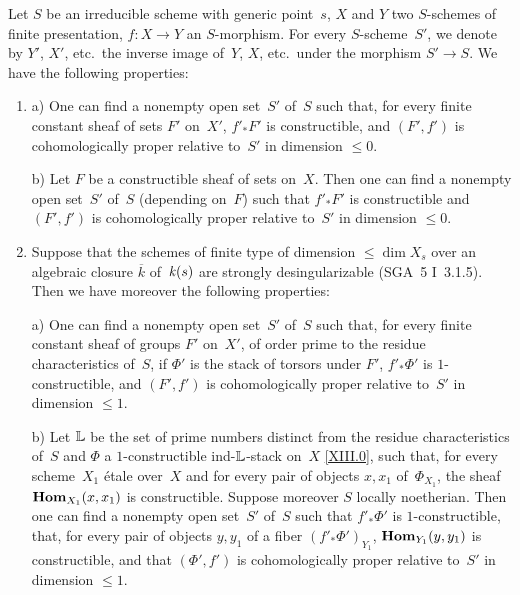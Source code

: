 \begin{theorem}
\label{XIII.3.1}
Let $S$ be an irreducible scheme with generic
point~$s$, $X$ and $Y$ two $S$-schemes of
finite presentation, $f\colon X \to Y$ an $S$-morphism. For every
$S$-scheme~$S'$, we denote by $Y'$, $X'$, etc.\ the inverse image of~$Y$,
$X$, etc.\ under the morphism $S' \to S$. We have the following
properties:

\begin{enumerate}
\item[1)]
{\upshape a)} One can find a nonempty open set~$S'$ of~$S$ such that, for
every finite constant sheaf of sets $F'$ on~$X'$, $f'_*F'$ is
constructible, and $(F',f')$ is cohomologically proper
relative to~$S'$ in dimension $\le 0$.

{\upshape b)} Let $F$ be a constructible sheaf of sets on~$X$. Then
one can find a nonempty open set~$S'$ of~$S$ (depending on~$F$)
such that $f'_*F'$ is constructible and $(F',f')$ is
cohomologically proper relative to~$S'$ in dimension $\le 0$.

\item[2)] Suppose that the schemes of finite type of dimension $\le
\dim X_s$ over an algebraic closure $\overline{k}$ of~$\mathit{k}(s)$
are strongly desingularizable \textup{(SGA~5 I~3.1.5)}. Then we have
moreover the following properties:

{\upshape a)} One can find a nonempty open set~$S'$ of~$S$ such that, for
every finite constant sheaf of groups $F'$ on~$X'$, of order prime
to the residue characteristics of~$S$, if $\Phi'$ is the
stack of torsors under $F'$, $f'_*\Phi'$ is $1$-constructible, and
$(F',f')$ is cohomologically proper relative to~$S'$ in
dimension $\le 1$.

{\upshape b)} Let $\mathbb{L}$ be the set of prime numbers distinct from the
residue characteristics of~$S$ and $\Phi$ a
$1$-constructible ind-$\mathbb{L}$-stack on~$X$ \eqref{XIII.0}, such that,
for every scheme~$X_1$ \'etale over~$X$ and for every pair
of objects $x, x_1$ of~$\Phi_{X_1}$, the sheaf $\operatorname{\mathbf{Hom}}
_{X_1}(x,x_1)$ is constructible. Suppose moreover $S$ locally
noetherian. Then one can find a nonempty open set~$S'$ of~$S$
such that $f'_*\Phi'$ is $1$-constructible, that, for every pair
of objects $y, y_1$ of a fiber $(f'_*\Phi')_{Y_1}$,
$\operatorname{\mathbf{Hom}}_{Y_1}(y,y_1)$ is constructible,
and that $(\Phi',f')$ is cohomologically proper relative to~$S'$ in dimension $\le 1$.
\end{enumerate}
\end{theorem}

